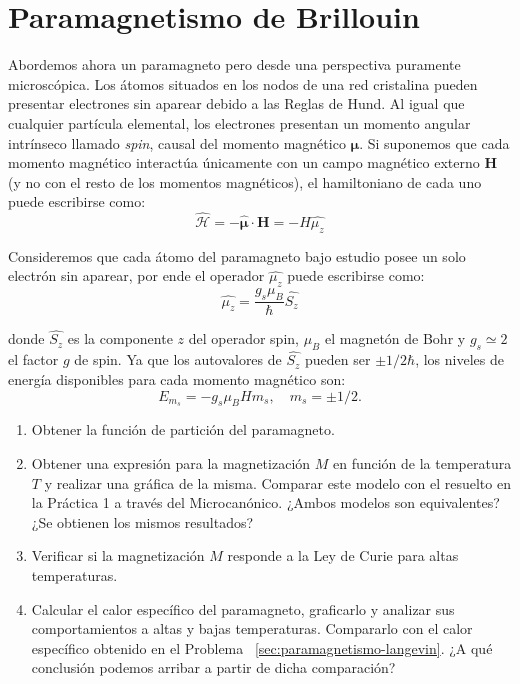 \documentclass[a4paper,11pt]{article}
\begin{document}
\section{Paramagnetismo de Brillouin}

Abordemos ahora un paramagneto pero desde una perspectiva puramente
microscópica. Los átomos situados en los nodos de una red cristalina pueden
presentar electrones sin aparear debido a las Reglas de Hund. Al igual que
cualquier partícula elemental, los electrones presentan un momento angular
intrínseco llamado \emph{spin}, causal del momento magnético
$\boldsymbol{\mu}$.
Si suponemos que cada momento magnético interactúa únicamente con un
campo magnético externo $\textbf{H}$ (y no con el resto de los momentos
magnéticos), el hamiltoniano de cada uno puede escribirse como:
$$ \hat{\mathcal{H}} =
- \hat{\boldsymbol{\mu}} \cdot \textbf{H} = - H \hat{\mu_z} $$

Consideremos que cada átomo del paramagneto bajo estudio posee un solo
electrón sin aparear, por ende el operador $\hat{\mu_z}$ puede
escribirse como:
$$ \hat{\mu_z} = \frac{g_s \mu_B}{\hbar} \hat{S_z} $$

donde $\hat{S_z}$ es la componente $z$ del operador spin, $\mu_B$ el
magnetón de Bohr y $g_s \simeq 2$ el factor $g$ de spin. Ya que los
autovalores de $\hat{S_z}$ pueden ser $\pm 1/2 \hbar$, los niveles de
energía disponibles para cada momento magnético son:
$$ E_{m_s} = - g_s \mu_B H m_s, \quad  m_s = \pm 1/2.$$

\begin{enumerate}[label=(\alph*),
                  leftmargin=2\parindent,
                  rightmargin=2\parindent]

    \item{Obtener la función de partición del paramagneto.}

    \item{Obtener una expresión para la magnetización $M$ en función
          de la temperatura $T$ y realizar una gráfica de la misma.
          Comparar este modelo con el resuelto en la Práctica 1 a
          través del Microcanónico.
          ¿Ambos modelos son equivalentes?
          ¿Se obtienen los mismos resultados?}

    \item{Verificar si la magnetización $M$ responde a la Ley de Curie
          para altas temperaturas.}

    \item{Calcular el calor específico del paramagneto, graficarlo y
          analizar sus comportamientos a altas y bajas temperaturas.
          Compararlo con el calor específico obtenido en el
          Problema~ \ref{sec:paramagnetismo-langevin}.
          ¿A qué conclusión podemos arribar a partir de dicha comparación?
          }

\end{enumerate}
\end{document}
